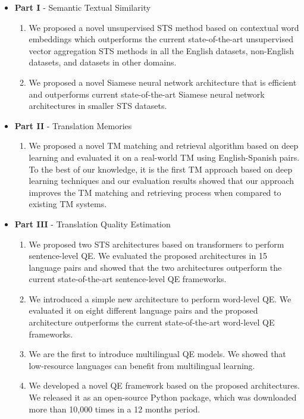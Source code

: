 \begin{itemize}
	\item \textbf{Part I} - Semantic Textual Similarity
	\begin{enumerate}
		\item We proposed a novel unsupervised STS method based on contextual word embeddings which outperforms the current state-of-the-art unsupervised vector aggregation STS methods in all the English datasets, non-English datasets, and datasets in other domains.
		
		\item We proposed a novel Siamese neural network architecture that is efficient and outperforms current state-of-the-art Siamese neural network architectures in smaller STS datasets.  
		
	\end{enumerate}

\vspace{2mm}
	
	\item \textbf{Part II} - Translation Memories
	\begin{enumerate}
		\item We proposed a novel TM matching and retrieval algorithm based on deep learning and evaluated it on a real-world TM using English-Spanish pairs. To the best of our knowledge, it is the first TM approach based on deep learning techniques and our evaluation results showed that our approach improves the TM matching and retrieving process when compared to existing TM systems.
	\end{enumerate}
	
	\item \textbf{Part III} - Translation Quality Estimation
	\begin{enumerate}
		\item  We proposed two STS architectures based on transformers to perform sentence-level QE. We evaluated the proposed architectures in 15 language pairs and showed that the two architectures outperform the current state-of-the-art sentence-level QE frameworks.
		
		\item We introduced a simple new architecture to perform word-level QE. We evaluated it on eight different language pairs and the proposed architecture outperforms the current state-of-the-art word-level QE frameworks.
		
		\item We are the first to introduce multilingual QE models. We showed that low-resource languages can benefit from multilingual learning.
		
		\item We developed a novel QE framework based on the proposed architectures. We released it as an open-source Python package, which was downloaded more than 10,000 times in a 12 months period.
	\end{enumerate}
\end{itemize}

